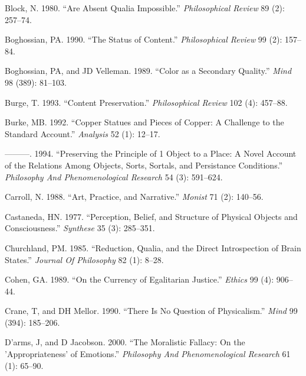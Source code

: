 \documentclass[
  10pt,
  letterpaper,
  DIV=11,
  numbers=noendperiod,
  twoside]{scrartcl}
\newlength{\cslhangindent}
\newenvironment{CSLReferences}[2] %
 {\begin{list}{}{%
  \setlength{\itemindent}{0pt}
  \setlength{\leftmargin}{0pt}
  \setlength{\parsep}{0pt}
  \ifodd #1
   \setlength{\leftmargin}{\cslhangindent}
   \setlength{\itemindent}{-1\cslhangindent}
  \fi
  \setlength{\itemsep}{#2\baselineskip}}}
 {\end{list}}
\begin{document}
\label{refs}
\begin{CSLReferences}{1}{0}
Block, N. 1980. {``Are Absent Qualia Impossible.''} \emph{Philosophical
Review} 89 (2): 257--74.

Boghossian, PA. 1990. {``The Status of Content.''} \emph{Philosophical
Review} 99 (2): 157--84.

Boghossian, PA, and JD Velleman. 1989. {``Color as a Secondary
Quality.''} \emph{Mind} 98 (389): 81--103.

Burge, T. 1993. {``Content Preservation.''} \emph{Philosophical Review}
102 (4): 457--88.

Burke, MB. 1992. {``Copper Statues and Pieces of Copper: A Challenge to
the Standard Account.''} \emph{Analysis} 52 (1): 12--17.

---------. 1994. {``Preserving the Principle of 1 Object to a Place: A
Novel Account of the Relations Among Objects, Sorts, Sortals, and
Persistance Conditions.''} \emph{Philosophy And Phenomenological
Research} 54 (3): 591--624.

Carroll, N. 1988. {``Art, Practice, and Narrative.''} \emph{Monist} 71
(2): 140--56.

Castaneda, HN. 1977. {``Perception, Belief, and Structure of Physical
Objects and Consciousness.''} \emph{Synthese} 35 (3): 285--351.

Churchland, PM. 1985. {``Reduction, Qualia, and the Direct Introspection
of Brain States.''} \emph{Journal Of Philosophy} 82 (1): 8--28.

Cohen, GA. 1989. {``On the Currency of Egalitarian Justice.''}
\emph{Ethics} 99 (4): 906--44.

Crane, T, and DH Mellor. 1990. {``There Is No Question of
Physicalism.''} \emph{Mind} 99 (394): 185--206.

D'arms, J, and D Jacobson. 2000. {``The Moralistic Fallacy: On the
'Appropriateness' of Emotions.''} \emph{Philosophy And Phenomenological
Research} 61 (1): 65--90.


\end{CSLReferences}
\end{document}
